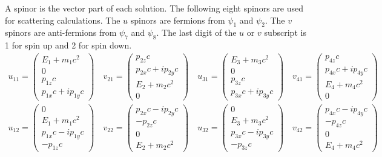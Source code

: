 \documentclass[12pt]{article}
\begin{document}
\noindent
A spinor is the vector part of each solution.
The following eight spinors are used for scattering calculations.
The $u$ spinors are fermions from $\psi_1$ and $\psi_2$.
The $v$ spinors are anti-fermions from $\psi_7$ and $\psi_8$.
The last digit of the $u$ or $v$ subscript is 1 for spin up and 2 for spin down.
\begin{gather*}
u_{11}=\begin{pmatrix}E_1+m_1c^2\\0\\p_{1z}c\\p_{1x}c+ip_{1y}c\end{pmatrix}\quad
v_{21}=\begin{pmatrix}p_{2z}c\\p_{2x}c+ip_{2y}c\\E_2+m_2c^2\\0\end{pmatrix}\quad
u_{31}=\begin{pmatrix}E_3+m_3c^2\\0\\p_{3z}c\\p_{3x}c+ip_{3y}c\end{pmatrix}\quad
v_{41}=\begin{pmatrix}p_{4z}c\\p_{4x}c+ip_{4y}c\\E_4+m_4c^2\\0\end{pmatrix}\\
u_{12}=\begin{pmatrix}0\\E_1+m_1c^2\\p_{1x}c-ip_{1y}c\\-p_{1z}c\end{pmatrix}\quad
v_{22}=\begin{pmatrix}p_{2x}c-ip_{2y}c\\-p_{2z}c\\0\\E_2+m_2c^2\end{pmatrix}\quad
u_{32}=\begin{pmatrix}0\\E_3+m_3c^2\\p_{3x}c-ip_{3y}c\\-p_{3z}c\end{pmatrix}\quad
v_{42}=\begin{pmatrix}p_{4x}c-ip_{4y}c\\-p_{4z}c\\0\\E_4+m_4c^2\end{pmatrix}
\end{gather*}
\end{document}
